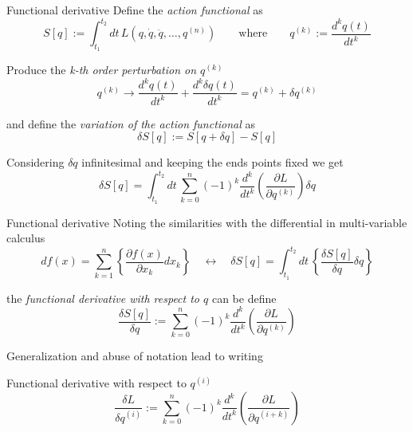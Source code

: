 \begin{frame}{Functional derivative}
  Define the \emph{action functional} as
  \begin{equation*}
    S[q] := \int_{t_1}^{t_2} dt \,
    L \left(q, \dot{q}, \ddot{q}, \ldots, q^{(n)} \right)
    \qquad \text{where} \qquad q^{(k)} := \frac{d^k q(t)}{dt^k}
  \end{equation*}

  Produce the \emph{k-th order perturbation on $q^{(k)}$}
  \begin{equation*}
    q^{(k)} \rightarrow \frac{d^k q(t)}{dt^k} + \frac{d^k \delta q(t)}{dt^k} =
    q^{(k)} + \delta q^{(k)}
  \end{equation*}

  and define the \emph{variation of the action functional} as
  \begin{equation*}
    \delta S[q] := S[q + \delta q] - S[q]
  \end{equation*}

  Considering $\delta q$ infinitesimal and keeping the ends points fixed we
  get %
  \begin{equation*}
    \delta S[q] = \int_{t_1}^{t_2} dt \,
    \sum_{k=0}^{n} {(-1)}^k \frac{d^k}{dt^k}
    \left(\frac{\partial L}{\partial q^{(k)}}\right) \delta q
  \end{equation*}
\end{frame}

\begin{frame}{Functional derivative}
  Noting the similarities with the differential in multi-variable calculus
  \begin{equation*}
    df(x) = \sum_{k=1}^{n}
    \left\{\frac{\partial f(x)}{\partial x_k} dx_k\right\}
    \quad \longleftrightarrow \quad
    \delta S[q] = \int_{t_1}^{t_2} dt \,
    \left\{ \frac{\delta S[q]}{\delta q} \delta q \right\}
  \end{equation*}

  the \emph{functional derivative with respect to $q$} can be define
  \begin{equation*}
    \frac{\delta S[q]}{\delta q}:=
    \sum_{k=0}^{n} {(-1)}^k \frac{d^k}{dt^k}
    \left(\frac{\partial L}{\partial q^{(k)}}\right)
  \end{equation*}

  Generalization and abuse of notation lead to writing
  \begin{block}{Functional derivative with respect to $q^{(i)}$}
    \begin{equation*}
      \frac{\delta L}{\delta q^{(i)}}:=
      \sum_{k=0}^{n} {(-1)}^k \frac{d^k}{dt^k}
      \left(\frac{\partial L}{\partial q^{(i+k)}}\right)
    \end{equation*}
  \end{block}
\end{frame}

